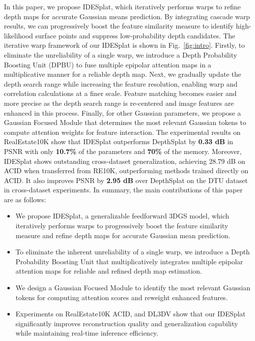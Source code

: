 %
In this paper, we propose IDESplat, which iteratively performs warps to refine depth maps for accurate Gaussian means prediction.
%
By integrating cascade warp results, we can progressively boost the feature similarity measure to identify high-likelihood surface points and suppress low-probability depth candidates.
%
The iterative warp framework of our IDESplat is shown in Fig.~\ref{fig:intro}.
%
%
Firstly, to eliminate the unreliability of a single warp, we introduce a Depth Probability Boosting Unit (DPBU) to fuse multiple epipolar attention maps in a multiplicative manner for a reliable depth map.
%
Next, we gradually update the depth search range while increasing the feature resolution, enabling warp and correlation calculations at a finer scale.
%
Feature matching becomes easier and more precise as the depth search range is re-centered and image features are enhanced in this process.
%
Finally, for other Gaussian parameters, we propose a Gaussian Focused Module that determines the most relevant Gaussian tokens to compute attention weights for feature interaction.
%
The experimental results on RealEstate10K show that IDESplat outperforms DepthSplat by \textbf{0.33 dB} in PSNR with only \textbf{10.7\%} of the parameters and \textbf{70\%} of the memory. 
%
%
Moreover, IDESplat shows outstanding cross-dataset generalization, achieving 28.79 dB on ACID when transferred from RE10K, outperforming methods trained directly on ACID. It also improves PSNR by \textbf{2.95 dB} over DepthSplat on the DTU dataset in cross-dataset experiments.
In summary, the main contributions of this paper are as follows:
%
\begin{itemize}
\item We propose IDESplat, a generalizable feedforward 3DGS model, which iteratively performs warps to progressively boost the feature similarity measure and refine depth maps for accurate Gaussian mean prediction.
%
\item To eliminate the inherent unreliability of a single warp, we introduce a Depth Probability Boosting Unit that multiplicatively integrates multiple epipolar attention maps for reliable and refined depth map estimation.
%
\item We design a Gaussian Focused Module to identify the most relevant Gaussian tokens for computing attention scores and reweight enhanced features.
%
\item Experiments on RealEstate10K ACID, and DL3DV show that our IDESplat significantly improves reconstruction quality and generalization capability while maintaining real-time inference efficiency.
\end{itemize}


























